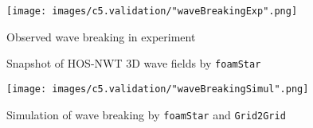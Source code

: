 	{
		\begin{figure} [H]
			\centering
			\texttt{[image: images/c5.validation/"waveBreakingExp".png]}
			\vspace{0.1cm}
			\caption{Observed wave breaking in experiment}
			\label{fig:waveBreakingExp}
		\end{figure}
	}	
	
	\pagebreak	
	
	{
		\begin{figure} [H]
			\centering
			 \quad
			\vspace{0.2cm}
			\caption{Snapshot of HOS-NWT 3D wave fields by \texttt{foamStar}}
			\label{fig:extremeWaveComparison}
		\end{figure}
	}
	
	{
		\begin{figure} [H]
			\centering
			\texttt{[image: images/c5.validation/"waveBreakingSimul".png]}
			\vspace{0.3cm}
			\caption{Simulation of wave breaking by \texttt{foamStar} and \texttt{Grid2Grid}}		
			\label{fig:waveBreakingSimulation}
		\end{figure}
	}		